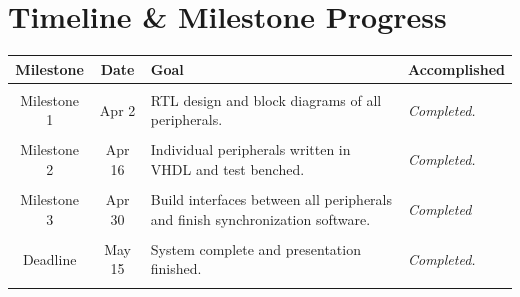 \documentclass{article}
\begin{document}
\section{Timeline \& Milestone Progress}
\begin{tabular}{cc|p{7cm}p{3cm}}
\textbf{Milestone} & \textbf{Date} & \textbf{Goal} & \textbf{Accomplished}\\ \hline
&&&\\
Milestone 1 & Apr 2 & RTL design and block diagrams of all peripherals.&
	\textit{Completed.}\\
&&&\\
Milestone 2 & Apr 16 & Individual peripherals written in VHDL and test benched.&
	\textit{Completed.}\\
&&&\\
Milestone 3 & Apr 30 & Build interfaces between all peripherals and finish synchronization software. &
	\textit{Completed}\\
&&&\\
Deadline&May 15&System complete and presentation finished.&\textit{Completed.}\\
&&&\\
\end{tabular}
\end{document}

